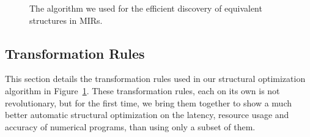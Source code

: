 \begin{figure}[ht]
    \centering
    \begin{algorithmic}
            \EndFor
        \EndFor
    \EndWhile
\EndFunction
    \end{algorithmic}
    \caption{%
        The algorithm we used for the efficient discovery of equivalent
        structures in MIRs.
    }
    \label{lo:alg:optimize}
\end{figure}

\subsection{Transformation Rules}
\label{lo:sub:transformation_rules}

This section details the transformation rules used in our structural
optimization algorithm in Figure~\ref{lo:alg:optimize}.  These transformation
rules, each on its own is not revolutionary, but for the first time, we bring
them together to show a much better automatic structural optimization on the
latency, resource usage and accuracy of numerical programs, than using only a
subset of them.

